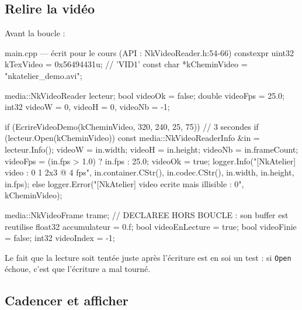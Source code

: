 \subsection{Relire la vidéo}

Avant la boucle :

\begin{nkcode}{main.cpp — écrit pour le cours (API : NkVideoReader.h:54-66)}
    constexpr uint32 kTexVideo = 0x56494431u;      // 'VID1'
    const char *kCheminVideo = "nkatelier_demo.avi";

    media::NkVideoReader lecteur;
    bool videoOk = false;
    double videoFps = 25.0;
    int32 videoW = 0, videoH = 0, videoNb = -1;

    if (EcrireVideoDemo(kCheminVideo, 320, 240, 25, 75)) {   // 3 secondes
        if (lecteur.Open(kCheminVideo)) {
            const media::NkVideoReaderInfo &in = lecteur.Info();
            videoW = in.width;
            videoH = in.height;
            videoNb = in.frameCount;
            videoFps = (in.fps > 1.0) ? in.fps : 25.0;
            videoOk = true;
            logger.Info("[NkAtelier] video : {0} {1} {2}x{3} @ {4} fps",
                        in.container.CStr(), in.codec.CStr(), in.width, in.height, in.fps);
        } else {
            logger.Error("[NkAtelier] video ecrite mais illisible : {0}", kCheminVideo);
        }
    }

    media::NkVideoFrame trame;      // DECLAREE HORS BOUCLE : son buffer est reutilise
    float32 accumulateur = 0.f;
    bool videoEnLecture = true;
    bool videoFinie = false;
    int32 videoIndex = -1;
\end{nkcode}

Le fait que la lecture soit tentée juste après l'écriture est en soi un test :
si \texttt{Open} échoue, c'est que l'écriture a mal tourné.

\subsection{Cadencer et afficher}

